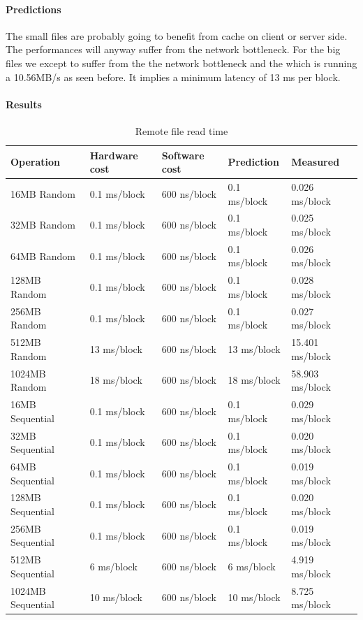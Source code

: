 \paragraph{Predictions}
The small files are probably going to benefit from cache on client or server
side.
The performances will anyway suffer from the network bottleneck.
For the big files we except to suffer from the the network bottleneck and the
which is running a 10.56MB/s as seen before.
It implies a minimum latency of 13 ms per block.

\paragraph{Results}

\begin{table}[h]
\begin{center}
\begin{tabular}{| l | l | l | l | l |}
\hline
Operation & Hardware cost & Software cost & Prediction & Measured \\
\hline

16MB Random	& 0.1 ms/block	& 600 ns/block  & 0.1 ms/block	& 0.026   ms/block \\ \hline
32MB Random	& 0.1 ms/block	& 600 ns/block  & 0.1 ms/block	& 0.025   ms/block \\ \hline
64MB Random	& 0.1 ms/block	& 600 ns/block  & 0.1 ms/block	& 0.026   ms/block \\ \hline
128MB Random 	& 0.1 ms/block	& 600 ns/block  & 0.1 ms/block	& 0.028   ms/block \\ \hline
256MB Random	& 0.1 ms/block	& 600 ns/block  & 0.1 ms/block	& 0.027   ms/block \\ \hline
512MB Random	& 13 ms/block	& 600 ns/block  & 13 ms/block	& 15.401   ms/block \\ \hline
1024MB Random	& 18 ms/block	& 600 ns/block  & 18 ms/block	& 58.903   ms/block \\ \hline\hline

16MB Sequential	& 0.1 ms/block	& 600 ns/block  & 0.1 ms/block        & 0.029    ms/block \\ \hline
32MB Sequential	& 0.1 ms/block	& 600 ns/block  & 0.1 ms/block        & 0.020    ms/block \\ \hline
64MB Sequential	& 0.1 ms/block	& 600 ns/block  & 0.1 ms/block        & 0.019    ms/block \\ \hline
128MB Sequential 	& 0.1 ms/block & 600 ns/block       & 0.1 ms/block        & 0.020    ms/block \\ \hline
256MB Sequential	& 0.1 ms/block & 600 ns/block      & 0.1 ms/block       & 0.019    ms/block \\ \hline
512MB Sequential	& 6 ms/block   & 600 ns/block      & 6 ms/block       & 4.919    ms/block \\ \hline
1024MB Sequential	& 10 ms/block  & 600 ns/block      & 10 ms/block       & 8.725    ms/block \\ \hline\hline 

\end{tabular}
\end{center}
\caption{Remote file read time\label{tab:remote-file-access}}
\end{table}

